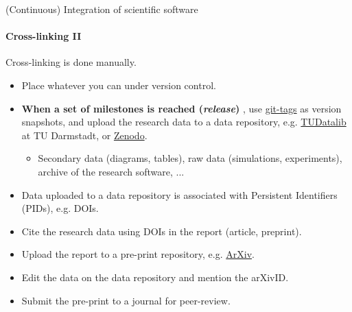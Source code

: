 \begin{frame}{(Continuous) Integration of scientific software} 
\framesubtitle{Cross-linking II}
\vfill

    Cross-linking is done manually. 
    \begin{itemize}
        \item Place whatever you can under version control. 
        \item \textbf{When a set of milestones is reached (\emph{release})} , use \href{https://git-scm.com/book/en/v2/Git-Basics-Tagging}{git-tags} as version snapshots, and upload the research data to a data repository, e.g. \href{https://tudatalib.ulb.tu-darmstadt.de/}{TUDatalib} at TU Darmstadt, or \href{https://zenodo.org/}{Zenodo}.
            \begin{itemize}
                \item Secondary data (diagrams, tables), raw data (simulations, experiments), archive of the research software, ...
            \end{itemize}
        \item Data uploaded to a data repository is associated with Persistent Identifiers (PIDs), e.g. DOIs.
        \item Cite the research data using DOIs in the report (article, preprint).
        \item Upload the report to a pre-print repository, e.g. \href{https://arxiv.org/}{ArXiv}. 
        \item Edit the data on the data repository and mention the arXivID.  
        \item Submit the pre-print to a journal for peer-review.
    \end{itemize}

\end{frame}


%
%

